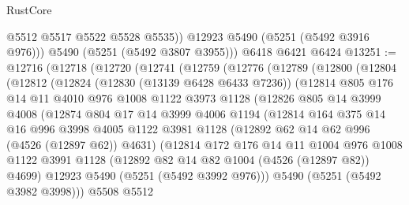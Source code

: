 \begin{lexlean}{RustCore}
\begin{coremodule}
            @5512
            @5517
            @5522
            @5528
            @5535))
        @12923
        @5490
        (@5251 (@5492 @3916 @976)))
      @5490
      (@5251 (@5492 @3807 @3955)))
    @6418
    @6421
    @6424
@13251 := @12716
    (@12718
      (@12720
        (@12741
          (@12759
            (@12776
              (@12789
                (@12800
                  (@12804
                    (@12812
                      (@12824
                        (@12830 (@13139 @6428 @6433 @7236))
                        (@12814
                          @805
                          @176
                          @14
                          @11
                          @4010
                          @976
                          @1008
                          @1122
                          @3973
                          @1128
                          (@12826
                            @805
                            @14
                            @3999
                            @4008
                            (@12874
                              @804
                              @17
                              @14
                              @3999
                              @4006
                              @1194
                              (@12814
                                @164
                                @375
                                @14
                                @16
                                @996
                                @3998
                                @4005
                                @1122
                                @3981
                                @1128
                                (@12892 @62 @14 @62 @996 (@4526 (@12897 @62)) @4631)
                                (@12814
                                  @172
                                  @176
                                  @14
                                  @11
                                  @1004
                                  @976
                                  @1008
                                  @1122
                                  @3991
                                  @1128
                                  (@12892 @82 @14 @82 @1004 (@4526 (@12897 @82)) @4699)
                                  @12923
                                  @5490
                                  (@5251 (@5492 @3992 @976)))
                                @5490
                                (@5251 (@5492 @3982 @3998)))
                              @5508
                              @5512

\end{coremodule}
\end{lexlean}

